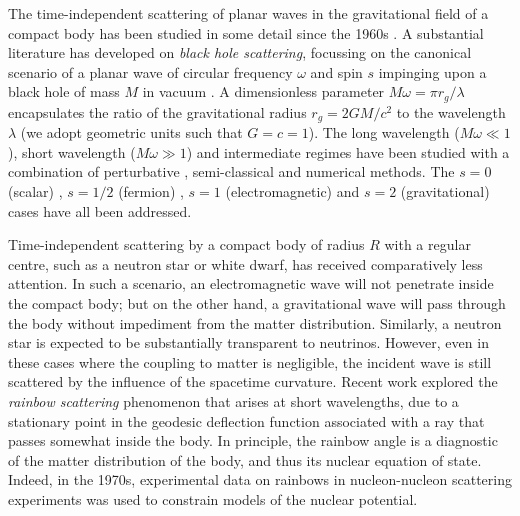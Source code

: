 \documentclass[aps,prd,longbibliography,reprint,twocolumn,amsmath,amssymb,amsfonts,showpacs,superscriptaddress]{revtex4-1}%
\begin{document}
The time-independent scattering of planar waves in the gravitational field of a compact body has been studied in some detail since the 1960s \cite{Hildreth1964PhDT64, Matzner:1968, Vishveshwara:1970}. A substantial literature has developed on \emph{black hole scattering}, focussing on the canonical scenario of a planar wave of circular frequency $\omega$ and spin $s$ \cite{Chrzanowski:1976jb} impinging upon a black hole of mass $M$ in vacuum \cite{Hildreth1964PhDT64, Matzner:1968, Vishveshwara:1970, Mashhoon:1973zz,Fabbri:1975,Sanchez:1977vz,MatznerRyan1978,Handler:1980un,Matzner:1985rjn,Futterman:1988ni,Andersson:1995vi,Glampedakis:2001cx,Dolan:2006vj,Dolan:2007ut,Dolan:2008kf,Crispino:2009xt,Cotaescu:2014jca,Gussmann:2016mkp}. A dimensionless parameter
$
M \omega = \pi r_g / \lambda
$
encapsulates the ratio of the gravitational radius $r_g = 2GM/c^2$ to the wavelength $\lambda$ (we adopt geometric units such that $G=c=1$). The long wavelength ($M \omega \ll 1$), short wavelength ($M \omega \gg 1$) and intermediate regimes have been studied with a combination of perturbative \cite{DeLogi:1977dp,Dolan:2007ut,Guadagnini:2008ha,Sorge:2015yoa}, semi-classical \cite{Matzner:1985rjn, Anninos:1992ih} and numerical methods. The $s = 0$ (scalar) \cite{Matzner:1968,Sanchez:1977vz,Andersson:1995vi,Glampedakis:2001cx,Leite:2019eis}, $s=1/2$ (fermion) \cite{Dolan:2006vj,Cotaescu:2014jca}, $s=1$ (electromagnetic) \cite{Fabbri:1975, Crispino:2009xt, Crispino:2015gua} and $s=2$ (gravitational) cases \cite{MatznerRyan1978,Handler:1980un,Dolan:2008kf} have all been addressed.

Time-independent scattering by a compact body of radius $R$ with a regular centre, such as a neutron star or white dwarf, has received comparatively less attention. In such a scenario, an electromagnetic wave will not penetrate inside the compact body; but on the other hand, a gravitational wave will pass through the body without impediment from the matter distribution. Similarly, a neutron star is expected to be substantially transparent to neutrinos. However, even in these cases where the coupling to matter is negligible, the incident wave is still scattered by the influence of the spacetime curvature. Recent work \cite{Dolan:2017rtj, Stratton:2019deq} explored the \emph{rainbow scattering} phenomenon that arises at short wavelengths, due to a stationary point in the geodesic deflection function associated with a ray that passes somewhat inside the body. In principle, the rainbow angle is a diagnostic of the matter distribution of the body, and thus its nuclear equation of state. Indeed, in the 1970s, experimental data on rainbows in nucleon-nucleon scattering experiments was used to constrain models of the nuclear potential. 
\end{document}
